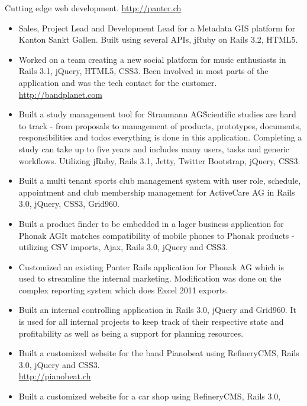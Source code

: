 \documentclass[10pt,a4paper]{moderncv}
\begin{document}
{Cutting edge web development.
\newline
\url{http://panter.ch}
\newline
\begin{itemize}
  \item Sales, Project Lead and Development Lead for a Metadata GIS platform
  for Kanton Sankt Gallen. Built using several APIs, jRuby on Rails 3.2, HTML5.
  \item Worked on a team creating a new social platform for music enthusiasts
    in Rails 3.1, jQuery, HTML5, CSS3. Been involved in most parts of the application
    and was the tech contact for the customer.\\
        \url{http://bandplanet.com}
  \item Built a study management tool for Straumann AG\. Scientific studies are
    hard to track - from proposals to management of
    products, prototypes, documents, responsibilities and todos everything is done
    in this application. Completing a study can take up to five years and
    includes many users, tasks and generic workflows. Utilizing jRuby, Rails
    3.1, Jetty, Twitter Bootstrap, jQuery, CSS3.
  \item Built a multi tenant sports club management system with user role,
    schedule, appointment and club membership management for ActiveCare AG in
    Rails 3.0, jQuery, CSS3, Grid960.
  \item Built a product finder to be embedded in a lager business application
    for Phonak AG\. It matches compatibility of mobile phones to Phonak
    products - utilizing CSV imports, Ajax, Rails 3.0, jQuery and
    CSS3.
  \item Customized an existing Panter Rails application for Phonak AG which
    is used to streamline the internal marketing. Modification was done on the
    complex reporting system which does Excel 2011 exports.
  \item Built an internal controlling application in Rails 3.0, jQuery and
    Grid960. It is used for all internal projects to keep track of their
    respective state and profitability as well as being a support for planning
    resources.
  \item Built a customized website for the band Pianobeat using RefineryCMS, Rails 3.0,
    jQuery and CSS3.\\
        \url{http://pianobeat.ch}
  \item Built a customized website for a car shop using RefineryCMS, Rails 3.0,

\end{itemize}}
\end{document}
